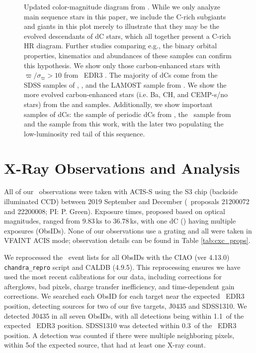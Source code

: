 \documentclass[twocolumn, tighten, times, astrosymb]{aastex631}
\begin{document}
\begin{figure}
\centering
{}
\caption{Updated color-magnitude diagram from \citet{Green2019}. While we only analyze main sequence stars in this paper, we include the C-rich subgiants and giants in this plot merely to illustrate that they may be the evolved descendants of dC stars, which all together present a C-rich HR diagram.  Further studies comparing e.g., the binary orbital properties, kinematics and abundances of these samples can confirm this hypothesis. We show only those carbon-enhanced stars with $\varpi/\sigma_\varpi > 10$ from  \Gaia\ EDR3 \citep{GaiaEDR3}. The majority of dCs come from the SDSS samples of \citet{Green2013}, \citet{Si2014}, and the LAMOST sample from \citet{Li2018}. We show the more evolved carbon-enhanced stars (i.e. Ba, CH, and CEMP-s/no stars) from the  \citet{Yoon2016}  and \citet{Li2018} samples. Additionally, we show important samples of dCs: the sample of periodic dCs from \citet{Roulston2021a}, the \Chandra\ sample from \citet{Green2019} and the sample from this work, with the later two populating the low-luminosity red tail of this sequence.}
\label{fig:CMD}
\end{figure}


\section{X-Ray Observations and Analysis}\label{sec:xrays}


All of our \Chandra\ observations were taken with ACIS-S using the S3 chip (backside illuminated CCD) between 2019 September and  December (\Chandra\ proposals 21200072 and 22200008; PI: P. Green). Exposure times, proposed based on optical magnitudes, ranged from 9.83\,ks to 36.78\,ks, with one dC () having multiple exposures (ObsIDs). None of our observations use a grating and all were taken in VFAINT ACIS mode; observation details can be found in Table \ref{tab:cxc_props}. 


We reprocessed the \Chandra\ event lists for all ObsIDs with the CIAO (ver 4.13.0) \texttt{chandra\_repro} script and CALDB (4.9.5). This reprocessing ensures we have used the most recent calibrations for our data, including corrections for afterglows, bad pixels, charge transfer inefficiency, and time-dependent gain corrections. We searched each ObsID for each target near the expected  \Gaia\ EDR3 position, detecting sources for two of our five targets, J0435 and SDSS1310. We detected J0435 in all seven ObsIDs, with all detections being within 1.1\arcsec\ of the expected  \Gaia\ EDR3 position. SDSS1310 was detected within 0.3\arcsec\ of the  \Gaia\ EDR3 position. A detection was counted if there were multiple neighboring pixels, within 5\arcsec of the expected source, that had at least one X-ray count.
\end{document}
